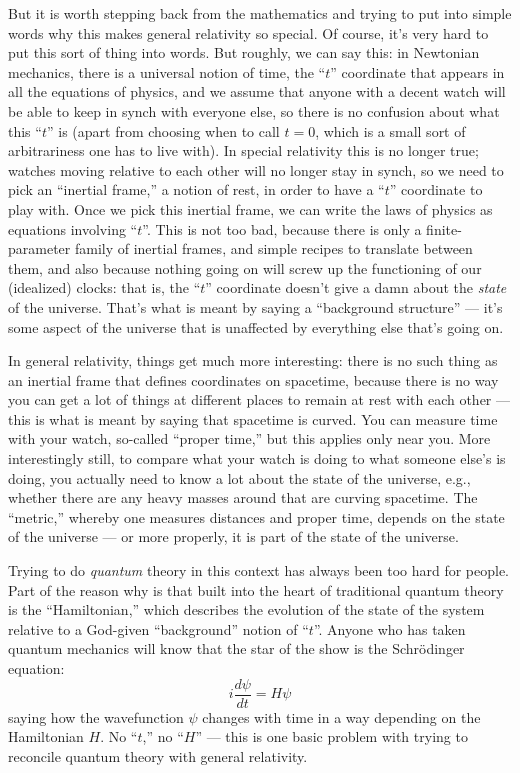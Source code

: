 \documentclass[12pt]{article}
\begin{document}
But it is worth stepping back from the mathematics and trying to put
into simple words why this makes general relativity so special. Of
course, it's very hard to put this sort of thing into words. But
roughly, we can say this: in Newtonian mechanics, there is a universal
notion of time, the ``\(t\)'' coordinate that appears in all the
equations of physics, and we assume that anyone with a decent watch will
be able to keep in synch with everyone else, so there is no confusion
about what this ``\(t\)'' is (apart from choosing when to call
\(t = 0\), which is a small sort of arbitrariness one has to live with).
In special relativity this is no longer true; watches moving relative to
each other will no longer stay in synch, so we need to pick an
``inertial frame,'' a notion of rest, in order to have a ``\(t\)''
coordinate to play with. Once we pick this inertial frame, we can write
the laws of physics as equations involving ``\(t\)''. This is not too
bad, because there is only a finite-parameter family of inertial frames,
and simple recipes to translate between them, and also because nothing
going on will screw up the functioning of our (idealized) clocks: that
is, the ``\(t\)'' coordinate doesn't give a damn about the \emph{state}
of the universe. That's what is meant by saying a ``background
structure'' --- it's some aspect of the universe that is unaffected by
everything else that's going on.

In general relativity, things get much more interesting: there is no
such thing as an inertial frame that defines coordinates on spacetime,
because there is no way you can get a lot of things at different places
to remain at rest with each other --- this is what is meant by saying
that spacetime is curved. You can measure time with your watch,
so-called ``proper time,'' but this applies only near you. More
interestingly still, to compare what your watch is doing to what someone
else's is doing, you actually need to know a lot about the state of the
universe, e.g., whether there are any heavy masses around that are
curving spacetime. The ``metric,'' whereby one measures distances and
proper time, depends on the state of the universe --- or more properly,
it is part of the state of the universe.

Trying to do \emph{quantum} theory in this context has always been too
hard for people. Part of the reason why is that built into the heart of
traditional quantum theory is the ``Hamiltonian,'' which describes the
evolution of the state of the system relative to a God-given
``background'' notion of ``\(t\)''. Anyone who has taken quantum
mechanics will know that the star of the show is the Schr\"odinger
equation: \[i\frac{d\psi}{dt} = H\psi\] saying how the wavefunction
\(\psi\) changes with time in a way depending on the Hamiltonian \(H\).
No ``\(t\),'' no ``\(H\)'' --- this is one basic problem with trying to
reconcile quantum theory with general relativity.
\end{document}
